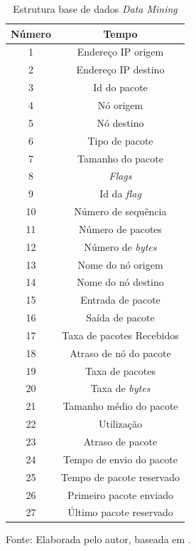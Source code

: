 \begin{table}[!b]
	\centering
	\begin{threeparttable}
		\caption{Estrutura base de dados \textit{Data Mining}}
		\label{Tab:DataMining}
		\begin{tabular}{c c }
			\toprule
			\textbf{Número} & \textbf{Tempo}
			\\ \midrule
			1 &  Endereço IP origem  \\ \midrule
			2 &  Endereço IP destino  \\ \midrule
			3 &  Id do pacote  \\ \midrule
			4 &  Nó origem  \\ \midrule
			5 &  Nó destino  \\ \midrule
			6 &  Tipo de pacote  \\ \midrule
			7 &  Tamanho do pacote  \\ \midrule
			8 &  \textit{Flags}  \\ \midrule
			9 &   Id da \textit{flag}  \\ \midrule
			10 &  Número de sequência  \\ \midrule
			11 &  Número de pacotes  \\ \midrule
			12 &  Número de \textit{bytes}  \\ \midrule
			13 &  Nome do nó origem  \\ \midrule
			14 &  Nome do nó destino  \\ \midrule
			15 &  Entrada de pacote  \\ \midrule
			16 &  Saída de pacote  \\ \midrule
			17 &  Taxa de pacotes Recebidos \\ \midrule%
			18 &  Atraso de nó do pacote  \\ \midrule
			19 &  Taxa de pacotes\\ \midrule
			20 &  Taxa de \textit{bytes}  \\ \midrule
			21 &  Tamanho  médio do pacote  \\ \midrule
			22 &  Utilização  \\ \midrule
			23 &  Atraso de pacote  \\ \midrule
			24 &  Tempo de envio do pacote  \\ \midrule
			25 &  Tempo de pacote reservado  \\ \midrule
			26 &  Primeiro pacote enviado  \\ \midrule
			27 &  Último pacote reservado \\ \bottomrule
		\end{tabular}
		{Fonte: Elaborada pelo autor, baseada em \cite{DataMining}.}
	\end{threeparttable}
\end{table}

